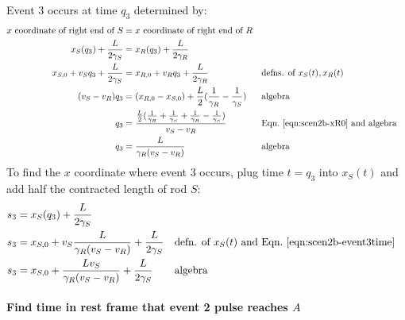 \documentclass[a4paper]{article}
\theoremstyle{plain}
\theoremstyle{definition}
\begin{document}
Event 3 occurs at time $q_3$ determined by:
\begin{align}
\text{$x$ coordinate of right end of $S$} & = \text{$x$ coordinate of right end of $R$} \nonumber \\
x_S(q_3) + \frac{L}{2\gamma_S} & = x_R(q_3) + \frac{L}{2\gamma_R} \nonumber \\
x_{S,0} + v_S q_3 + \frac{L}{2\gamma_S} & = x_{R,0} + v_R q_3 + \frac{L}{2\gamma_R} & & \text{defns. of $x_S(t), x_R(t)$} \nonumber \\
(v_S - v_R) q_3 & = (x_{R,0} - x_{S,0}) + \frac{L}{2} ( \frac{1}{\gamma_R} - \frac{1}{\gamma_S} ) & & \text{algebra} \nonumber \\
q_3 & = \frac{ \frac{L}{2} ( \frac{1}{\gamma_R} + \frac{1}{\gamma_S} + \frac{1}{\gamma_R} - \frac{1}{\gamma_S})}{v_S - v_R} & & \text{Eqn.~\eqref{eqn:scen2b-xR0} and algebra} \nonumber \\
q_3 & = \frac{L}{\gamma_R(v_S - v_R)} & & \text{algebra} \label{eqn:scen2b-event3time}
\end{align}
To find the $x$ coordinate where event 3 occurs, plug time $t=q_3$
into $x_S(t)$ and add half the contracted length of rod $S$:
\begin{align}
s_3 & = x_S(q_3) + \frac{L}{2\gamma_S} \nonumber \\
s_3 & = x_{S,0} + v_S \frac{L}{\gamma_R(v_S - v_R)} + \frac{L}{2\gamma_S} & & \text{defn. of $x_S(t)$ and Eqn.~\eqref{eqn:scen2b-event3time}} \nonumber \\
s_3 & = x_{S,0} + \frac{Lv_S}{\gamma_R(v_S - v_R)} + \frac{L}{2\gamma_S} & & \text{algebra} \label{eqn:scen2b-event3xcoord}
\end{align}


\paragraph{Find time in rest frame that event 2 pulse reaches $A$}
\end{document}
